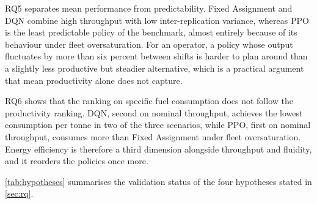 \documentclass[11pt,a4paper]{article}
\begin{document}
RQ5 separates mean performance from predictability. Fixed Assignment and DQN combine high throughput with low inter-replication variance, whereas PPO is the least predictable policy of the benchmark, almost entirely because of its behaviour under fleet oversaturation. For an operator, a policy whose output fluctuates by more than six percent between shifts is harder to plan around than a slightly less productive but steadier alternative, which is a practical argument that mean productivity alone does not capture.

RQ6 shows that the ranking on specific fuel consumption does not follow the productivity ranking. DQN, second on nominal throughput, achieves the lowest consumption per tonne in two of the three scenarios, while PPO, first on nominal throughput, consumes more than Fixed Assignment under fleet oversaturation. Energy efficiency is therefore a third dimension alongside throughput and fluidity, and it reorders the policies once more.

\cref{tab:hypotheses} summarises the validation status of the four hypotheses stated in \cref{sec:rq}.
\end{document}
